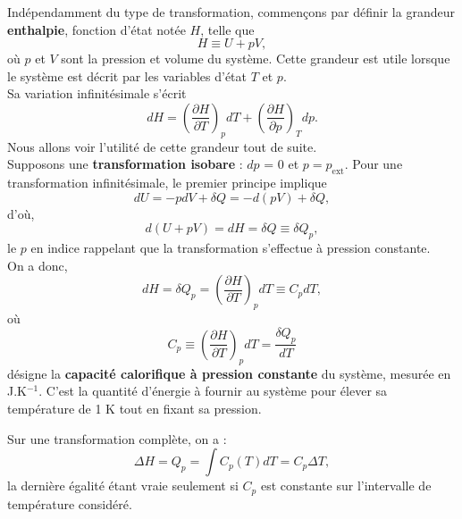 \documentclass[11pt,a4paper]{report}
\begin{document}
Indépendamment du type de transformation, commençons par définir la grandeur \textbf{enthalpie}, fonction d'état notée $H$, telle que
\begin{equation}
	H \equiv U + pV,
\end{equation}
où $p$ et $V$ sont la pression et volume du système. Cette grandeur est utile lorsque le système est décrit par les variables d'état $T$ et $p$.\\

Sa variation infinitésimale s'écrit
\begin{equation}
	dH = \left(\frac{\partial H}{\partial T}\right)_p dT + \left(\frac{\partial H}{\partial p}\right)_T dp.
\end{equation}
Nous allons voir l'utilité de cette grandeur tout de suite.\\

Supposons une \textbf{transformation isobare} : $dp$ = 0 et $p = p_\text{ext}$. Pour une transformation infinitésimale, le premier principe implique
\begin{equation}
	dU = -pdV + \delta Q = -d(pV) + \delta Q,
\end{equation}
d'où,
\begin{equation}
	d\left(U + pV\right) = dH = \delta Q \equiv \delta Q_p,
\end{equation}
le $p$ en indice rappelant que la transformation s'effectue à pression constante.\\

On a donc,
\begin{equation}
	dH = \delta Q_p = \left(\frac{\partial H}{\partial T}\right)_p dT \equiv C_p dT,
	\label{eq:dH_general}
\end{equation}
où
\begin{equation}
	C_p \equiv  \left(\frac{\partial H}{\partial T}\right)_p dT  = \frac{\delta Q_p}{dT}
\end{equation}
désigne la \textbf{capacité calorifique à pression constante} du système, mesurée en J.K$^{-1}$. 
C'est la quantité d'énergie à fournir au système pour élever sa température de 1 K tout en fixant sa pression.

Sur une transformation complète, on a :
\begin{equation}
	\Delta H = Q_p = \int C_p(T) dT = C_p \Delta T,
\end{equation}
la dernière égalité étant vraie seulement si $C_p$ est constante sur l'intervalle de température considéré.\\
\end{document}
